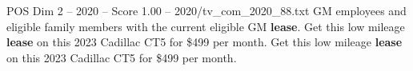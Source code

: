 \begin{textsample}{POS Dim 2 – 2020 – Score 1.00 – 2020/tv\_com\_2020\_88.txt}  \label{ex:f2_pos_080}
GM employees and eligible family members with the current eligible GM \textbf{lease}.
Get this low mileage \textbf{lease} on this 2023 Cadillac CT5 for \$499 per month.
Get this low mileage \textbf{lease} on this 2023 Cadillac CT5 for \$499 per month.

\end{textsample}

